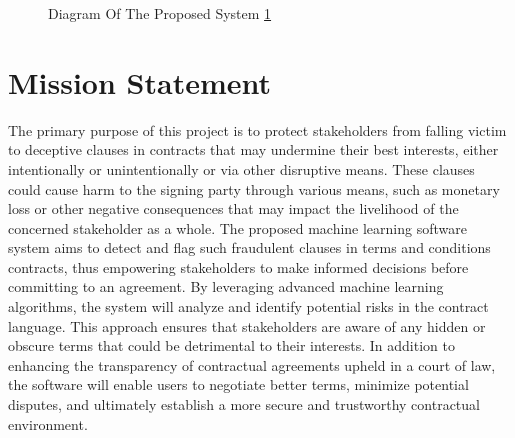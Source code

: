 \begin{figure}
\centering
{}
\caption{\label{Figure::Diagram Of The Proposed System} Diagram Of The Proposed System  \ref{Figure::Diagram Of The Proposed System}}
\end{figure}





\newpage

\section{Mission Statement \label{Section::Mission Statement} }
The primary purpose of this project is to protect stakeholders from falling victim to deceptive clauses in contracts that may undermine their best interests, either intentionally or unintentionally or via other disruptive means. These clauses could cause harm to the signing party through various means, such as monetary loss or other negative consequences that may impact the livelihood of the concerned stakeholder as a whole. 
The proposed machine learning software system aims to detect and flag such fraudulent clauses in terms and conditions contracts, thus empowering stakeholders to make informed decisions before committing to an agreement. 
By leveraging advanced machine learning algorithms, the system will analyze and identify potential risks in the contract language. This approach ensures that stakeholders are aware of any hidden or obscure terms that could be detrimental to their interests. In addition to enhancing the transparency of contractual agreements upheld in a court of law, the software will enable users to negotiate better terms, minimize potential disputes, and ultimately establish a more secure and trustworthy contractual environment.